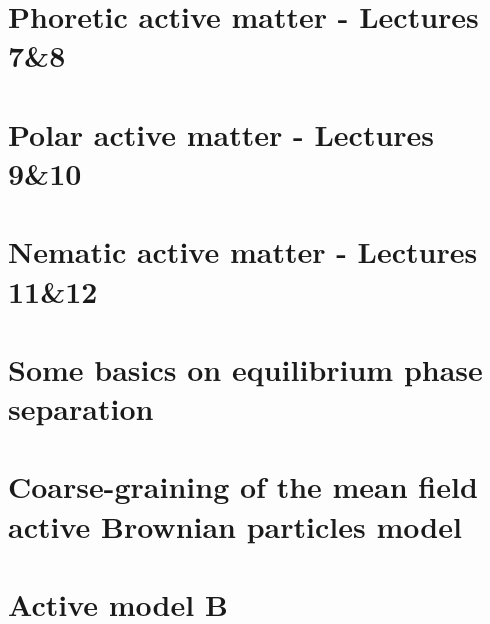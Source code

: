 \documentclass[10pt, a4paper, oneside]{book}
\begin{document}
    \chapter{Phoretic active matter - Lectures 7\&8}
    \label{chap_phoretic}
    

    \chapter{Polar active matter  - Lectures 9\&10}
    \label{chap_polar}
    

    \chapter{Nematic active matter  - Lectures 11\&12}
    \label{chap_nematic}
    

    \appendix

    \chapter{Some basics on equilibrium phase separation}
    

    \chapter{Coarse-graining of the mean field active Brownian particles model}
    

    \chapter{Active model B}
    

    
    

    
    
\end{document}
